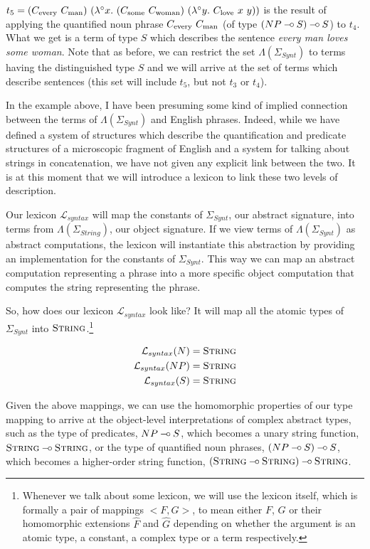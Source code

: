 $t_5 = (\synt{every}\ \synt{man})\ (\lambda^{\circ}
x.\ (\synt{some}\ \synt{woman})\ (\lambda^{\circ}
y.\ \synt{love}\ x\ y))$ is the result of applying the quantified noun
phrase $C_{\textrm{every}}\ C_{\textrm{man}}$ (of type $(NP \mathbin{{-}\mkern-3.5mu{\circ}} S) \mathbin{{-}\mkern-3.5mu{\circ}} S$) to
$t_4$. What we get is a term of type $S$ which describes the sentence
\emph{every man loves some woman}. Note that as before, we can restrict
the set $\Lambda(\Sigma_{Synt})$ to terms having the distinguished type
$S$ and we will arrive at the set of terms which describe sentences
(this set will include $t_5$, but not $t_3$ or $t_4$).

In the example above, I have been presuming some kind of implied
connection between the terms of $\Lambda(\Sigma_{Synt})$ and English
phrases. Indeed, while we have defined a system of structures which
describe the quantification and predicate structures of a microscopic
fragment of English and a system for talking about strings in
concatenation, we have not given any explicit link between the two. It
is at this moment that we will introduce a lexicon to link these two
levels of description.

Our lexicon $\mathcal{L}_{syntax}$ will map the constants of
$\Sigma_{Synt}$, our abstract signature, into terms from
$\Lambda(\Sigma_{String})$, our object signature. If we view terms of
$\Lambda(\Sigma_{Synt})$ as abstract computations, the lexicon will
instantiate this abstraction by providing an implementation for the
constants of $\Sigma_{Synt}$. This way we can map an abstract
computation representing a phrase into a more specific object
computation that computes the string representing the phrase.

So, how does our lexicon $\mathcal{L}_{syntax}$ look like? It will map
all the atomic types of $\Sigma_{Synt}$ into
$\textsc{String}$.\footnote{Whenever we talk about some lexicon, we will
  use the lexicon itself, which is formally a pair of mappings
  $\mathopen{<}F, G\mathclose{>}$, to mean either $F$, $G$ or their
  homomorphic extensions $\hat{F}$ and $\hat{G}$ depending on whether
  the argument is an atomic type, a constant, a complex type or a term
  respectively.}

\begin{align*}
\mathcal{L}_{syntax}(N) &= \textsc{String} \\
\mathcal{L}_{syntax}(NP) &= \textsc{String} \\
\mathcal{L}_{syntax}(S) &= \textsc{String}
\end{align*}

Given the above mappings, we can use the homomorphic properties of our
type mapping to arrive at the object-level interpretations of complex
abstract types, such as the type of predicates, $NP \mathbin{{-}\mkern-3.5mu{\circ}} S$, which
becomes a unary string function, $\textsc{String} \mathbin{{-}\mkern-3.5mu{\circ}}
\textsc{String}$, or the type of quantified noun phrases, $(NP \mathbin{{-}\mkern-3.5mu{\circ}} S)
\mathbin{{-}\mkern-3.5mu{\circ}} S$, which becomes a higher-order string function,
$(\textsc{String} \mathbin{{-}\mkern-3.5mu{\circ}} \textsc{String}) \mathbin{{-}\mkern-3.5mu{\circ}} \textsc{String}$.

